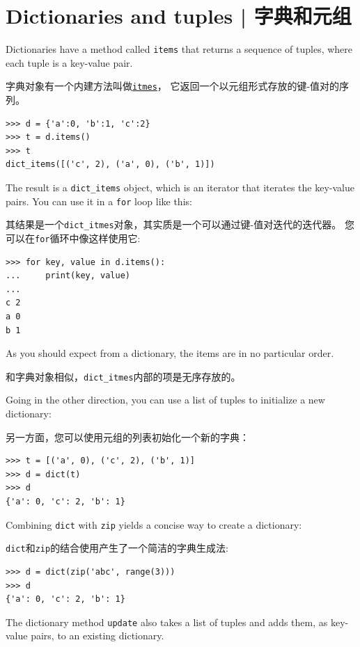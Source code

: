 \section{Dictionaries and tuples | 字典和元组}
\label{dictuple}
 
 

Dictionaries have a method called {\tt items} that returns a sequence of
tuples, where each tuple is a key-value pair.

字典对象有一个内建方法叫做\href{https://docs.python.org/3/library/stdtypes.html?highlight=items#dict.items}{\lstinline{itmes}}， 它返回一个以元组形式存放的键-值对的序列。

\begin{lstlisting}
>>> d = {'a':0, 'b':1, 'c':2}
>>> t = d.items()
>>> t
dict_items([('c', 2), ('a', 0), ('b', 1)])
\end{lstlisting}
%
The result is a \verb"dict_items" object, which is an iterator that
iterates the key-value pairs.  You can use it in a {\tt for} loop
like this:

其结果是一个\lstinline{dict_itmes}对象，其实质是一个可以通过键-值对迭代的迭代器。 您可以在\lstinline{for}循环中像这样使用它:

\begin{lstlisting}
>>> for key, value in d.items():
...     print(key, value)
...
c 2
a 0
b 1
\end{lstlisting}
%
As you should expect from a dictionary, the items are in no
particular order.

和字典对象相似，\lstinline{dict_itmes}内部的项是无序存放的。

Going in the other direction, you can use a list of tuples to
initialize a new dictionary:

另一方面，您可以使用元组的列表初始化一个新的字典：

\begin{lstlisting}
>>> t = [('a', 0), ('c', 2), ('b', 1)]
>>> d = dict(t)
>>> d
{'a': 0, 'c': 2, 'b': 1}
\end{lstlisting}

Combining {\tt dict} with {\tt zip} yields a concise way
to create a dictionary:

\lstinline{dict}和\lstinline{zip}的结合使用产生了一个简洁的字典生成法:

\begin{lstlisting}
>>> d = dict(zip('abc', range(3)))
>>> d
{'a': 0, 'c': 2, 'b': 1}
\end{lstlisting}
%
The dictionary method {\tt update} also takes a list of tuples
and adds them, as key-value pairs, to an existing dictionary.


